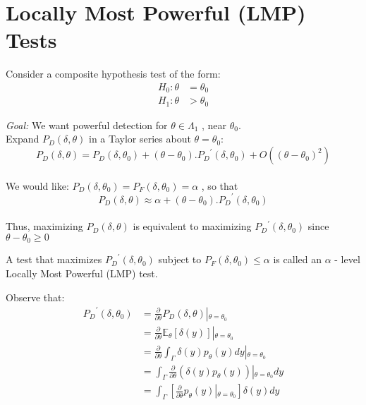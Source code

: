 \documentclass[12pt]{report}
\begin{document}
\section{Locally Most Powerful (LMP) Tests}

Consider a composite hypothesis test of the form:
\begin{align*}
H_0:\theta &= \theta_0 \\
H_1:\theta &> \theta_0
\end{align*}

\noindent \emph{Goal:} We want powerful detection for $\theta\in\Lambda_1$ , near $\theta_0$.\\
Expand $P_D(\delta,\theta)$ in a Taylor series about $\theta=\theta_0$:\\
$$P_D(\delta,\theta)=P_D(\delta,\theta_0) + (\theta-\theta_0).{P_D}^\prime(\delta,\theta_0) + O((\theta-\theta_0)^2)$$\\
We would like: $P_D(\delta,\theta_0)=P_F(\delta,\theta_0)=\alpha$ , so that\\
$$P_D(\delta,\theta)\approx \alpha + (\theta-\theta_0).{P_D}^\prime(\delta,\theta_0)$$\\
Thus, maximizing $P_D(\delta,\theta)$ is equivalent to maximizing ${P_D}^\prime(\delta,\theta_0)$ since $\theta-\theta_0 \geq 0$\\

\begin{defn}
A test that maximizes ${P_D}^\prime(\delta,\theta_0)$ subject to $P_F(\delta,\theta_0) \leq \alpha$ is called an $\alpha$ - level Locally Most Powerful (LMP) test.
\end{defn}

\noindent Observe that:
\begin{align*}
{P_D}^\prime(\delta,\theta_0) &= \frac{\partial}{\partial\theta}P_D(\delta,\theta)\left| {_{\theta = \theta_0}} \right.\\ &= \frac{\partial}{\partial\theta}\mathbb{E}_\theta[\delta(y)]\left| {_{\theta = \theta_0}} \right.\\ &= \frac{\partial}{\partial\theta}\int_{\Gamma}\delta(y)p_\theta(y)dy\left| {_{\theta = \theta_0}} \right.\\ &= \int_{\Gamma}\frac{\partial}{\partial\theta}(\delta(y)p_\theta(y))\left| {_{\theta = \theta_0}} \right.dy\\ &= \int_{\Gamma}\left[\frac{\partial}{\partial\theta}p_\theta(y)\left| {_{\theta = \theta_0}} \right.\right]\delta(y)dy \\
\end{align*}
\end{document}
